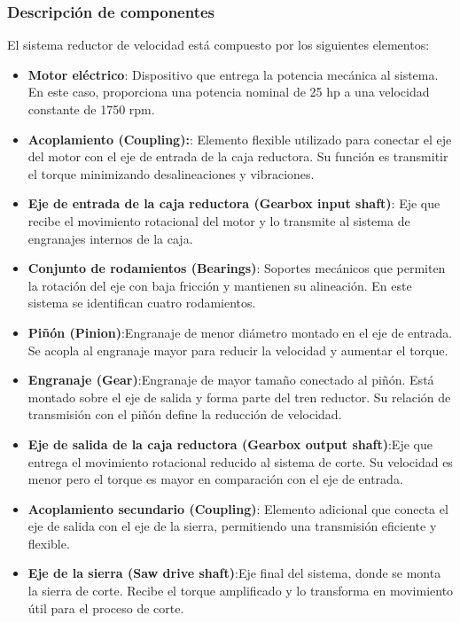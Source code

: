 \documentclass[12pt]{article}
\begin{document}
\subsubsection{Descripción de componentes}
El sistema reductor de velocidad está compuesto por los siguientes elementos:

\begin{itemize}
    \item \textbf{Motor eléctrico}: Dispositivo que entrega la potencia mecánica al sistema. En este caso, proporciona una potencia nominal de 25 hp a una velocidad constante de 1750 rpm.
    \item \textbf{Acoplamiento (Coupling):}: Elemento flexible utilizado para conectar el eje del motor con el eje de entrada de la caja reductora. Su función es transmitir el torque minimizando desalineaciones y vibraciones.
    \item \textbf{Eje de entrada de la caja reductora (Gearbox input shaft)}: Eje que recibe el movimiento rotacional del motor y lo transmite al sistema de engranajes internos de la caja.
    \item \textbf{Conjunto de rodamientos (Bearings)}: Soportes mecánicos que permiten la rotación del eje con baja fricción y mantienen su alineación. En este sistema se identifican cuatro rodamientos.
     \item \textbf{Piñón (Pinion)}:Engranaje de menor diámetro montado en el eje de entrada. Se acopla al engranaje mayor para reducir la velocidad y aumentar el torque.
     \item \textbf{Engranaje (Gear)}:Engranaje de mayor tamaño conectado al piñón. Está montado sobre el eje de salida y forma parte del tren reductor. Su relación de transmisión con el piñón define la reducción de velocidad.
     \item \textbf{Eje de salida de la caja reductora (Gearbox output shaft)}:Eje que entrega el movimiento rotacional reducido al sistema de corte. Su velocidad es menor pero el torque es mayor en comparación con el eje de entrada.
     \item \textbf{Acoplamiento secundario (Coupling)}: Elemento adicional que conecta el eje de salida con el eje de la sierra, permitiendo una transmisión eficiente y flexible.
     \item \textbf{Eje de la sierra (Saw drive shaft)}:Eje final del sistema, donde se monta la sierra de corte. Recibe el torque amplificado y lo transforma en movimiento útil para el proceso de corte.
    


\end{itemize}
\end{document}
